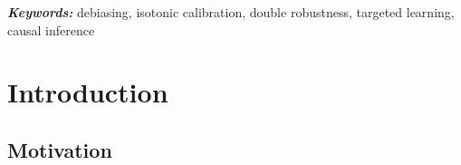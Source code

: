 \documentclass[11pt]{article}
\theoremstyle{plain}
\providecommand{\keywords}[1]
{
  \small
  \textbf{\textit{Keywords:}} #1
}
\begin{document}
\begin{abstract}



\end{abstract}

  \keywords{debiasing, isotonic calibration,  double robustness, targeted learning, causal inference}



\doublespacing

 

\section{Introduction}

\subsection{Motivation}

 
 
\end{document}
